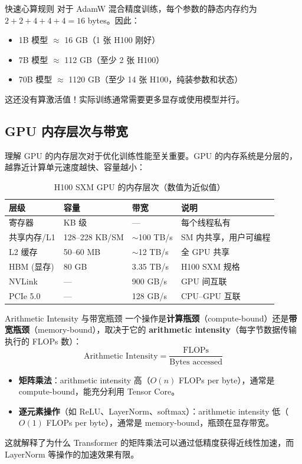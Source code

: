 \documentclass[a4paper]{article}
\begin{document}
\begin{knowledgebox}{快速心算规则}
对于 AdamW 混合精度训练，每个参数的静态内存约为 $2 + 2 + 4 + 4 + 4 = 16$ bytes。因此：
\begin{itemize}
    \item 1B 模型 $\approx$ 16 GB（1 张 H100 刚好）
    \item 7B 模型 $\approx$ 112 GB（至少 2 张 H100）
    \item 70B 模型 $\approx$ 1120 GB（至少 14 张 H100，纯装参数和状态）
\end{itemize}
这还没有算激活值！实际训练通常需要更多显存或使用模型并行。
\end{knowledgebox}

\subsection{GPU 内存层次与带宽}

理解 GPU 的内存层次对于优化训练性能至关重要。GPU 的内存系统是分层的，越靠近计算单元速度越快、容量越小：

\begin{table}[H]
\centering
\begin{tabular}{p{}p{}p{}p{}}
\toprule
\textbf{层级} & \textbf{容量} & \textbf{带宽} & \textbf{说明} \\
\midrule
寄存器 & KB 级 & --- & 每个线程私有 \\
共享内存/L1 & 128--228 KB/SM & $\sim$100 TB/s & SM 内共享，用户可编程 \\
L2 缓存 & 50--60 MB & $\sim$12 TB/s & 全 GPU 共享 \\
HBM (显存) & 80 GB & 3.35 TB/s & H100 SXM 规格 \\
NVLink & --- & 900 GB/s & GPU 间互联 \\
PCIe 5.0 & --- & 128 GB/s & CPU--GPU 互联 \\
\bottomrule
\end{tabular}
\caption{H100 SXM GPU 的内存层次（数值为近似值）}
\end{table}

\begin{importantbox}{Arithmetic Intensity 与带宽瓶颈}
一个操作是\textbf{计算瓶颈}（compute-bound）还是\textbf{带宽瓶颈}（memory-bound），取决于它的 \textbf{arithmetic intensity}（每字节数据传输执行的 FLOPs 数）：
$$
\text{Arithmetic Intensity} = \frac{\text{FLOPs}}{\text{Bytes accessed}}
$$
\begin{itemize}
    \item \textbf{矩阵乘法}：arithmetic intensity 高（$O(n)$ FLOPs per byte），通常是 compute-bound，能充分利用 Tensor Core。
    \item \textbf{逐元素操作}（如 ReLU、LayerNorm、softmax）：arithmetic intensity 低（$O(1)$ FLOPs per byte），通常是 memory-bound，瓶颈在显存带宽。
\end{itemize}
这就解释了为什么 Transformer 的矩阵乘法可以通过低精度获得近线性加速，而 LayerNorm 等操作的加速效果有限。
\end{importantbox}
\end{document}
